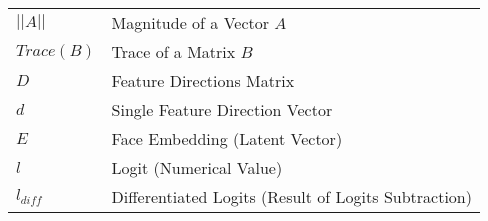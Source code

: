 \begin{tabular}{l l}
$||A||$ & Magnitude of a Vector $A$ \\
$Trace(B)$ & Trace of a Matrix $B$ \\
$D$ & Feature Directions Matrix \\
$d$ & Single Feature Direction Vector \\
$E$ & Face Embedding (Latent Vector) \\
$l$ & Logit (Numerical Value) \\
$l_{diff}$ & Differentiated Logits (Result of Logits Subtraction)
\end{tabular}